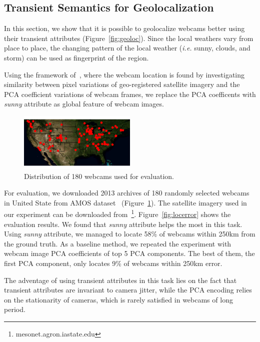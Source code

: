 \documentclass[10pt,twocolumn,letterpaper]{article}
\newcommand{\figref}[1]{Figure~\ref{fig:#1}}
\begin{document}
\subsection{Transient Semantics for Geolocalization}

In this section, we show that it is possible to geolocalize webcams
better using their transient attributes (\figref{geoloc}). Since the
local weathers vary from place to place, the changing pattern of the
local weather (\textit{i.e.} sunny, clouds, and storm) can be used as
fingerprint of the region.

Using the framework of~\cite{jacobs07geolocate}, where the webcam
location is found by investigating similarity between pixel variations
of geo-registered satellite imagery and the PCA coefficient variations
of webcam frames, we replace the PCA coefficents with \textit{sunny}
attribute as global feature of webcam images.

\begin{figure}
	\centering
		\includegraphics[width=0.5\textwidth, trim= 0mm 0mm 0mm 0mm]{figs/geoloc/webcam_dist}
		\caption{Distribution of 180 webcams used for evaluation.}
		\label{fig:webcamdist}
\end{figure}

For evaluation, we downloaded 2013 archives of 180 randomly selected
webcams in United State from AMOS dataset~\cite{jacobs07amos}
(\figref{webcamdist}). The satellite imagery used in our experiment
can be downloaded
from~\footnote{mesonet.agron.iastate.edu}. \figref{locerror} shows the
evaluation results. We found that \textit{sunny} attribute helps the
most in this task. Using \textit{sunny} attribute, we managed to
locate 58\% of webcams within 250km from the ground truth. As a
baseline method, we repeated the experiment with webcam image PCA
coefficients of top 5 PCA components. The best of them, the first PCA
component, only locates 9\% of webcams within 250km error.

The adventage of using transient attributes in this task lies on the
fact that transient attributes are invariant to camera jitter, while
the PCA encoding relies on the stationarity of cameras, which is
rarely satisfied in webcams of long period.
\end{document}
